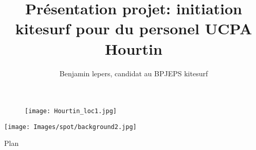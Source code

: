 \documentclass[10pt,a4paper]{beamer}
\author{Benjamin lepers, candidat au BPJEPS kitesurf}
\begin{document}
\title{Présentation projet: initiation kitesurf pour du personel UCPA Hourtin}
\begin{frame}
\titlepage
\begin{figure}
\texttt{[image: Hourtin\_loc1.jpg]} 
\end{figure}
\end{frame}

{
{
   \texttt{[image: Images/spot/background2.jpg]}
}
\begin{frame}{Plan}
\tableofcontents
\end{frame}
}



% 

\end{document}
